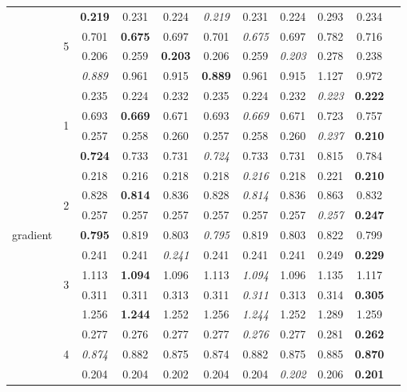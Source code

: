 \documentclass[authoryear, review, 11pt]{elsarticle}
\begin{document}
\begin{table}
\begin{center}
{\begin{tabular}{ccccccccccc}
  \cline{3-10}
  & \multirow{4}{*}{5} & \textbf{0.219} & 0.231 & 0.224 & \emph{0.219} & 0.231 & 0.224 & 0.293 & 0.234 \\ 
  &  & 0.701 & \textbf{0.675} & 0.697 & 0.701 & \emph{0.675} & 0.697 & 0.782 & 0.716 \\ 
  &  & 0.206 & 0.259 & \textbf{0.203} & 0.206 & 0.259 & \emph{0.203} & 0.278 & 0.238 \\ 
  &  & \emph{0.889} & 0.961 & 0.915 & \textbf{0.889} & 0.961 & 0.915 & 1.127 & 0.972 \\ 
  \hline
  \multirow{20}{*}{gradient} & \multirow{4}{*}{1} & 0.235 & 0.224 & 0.232 & 0.235 & 0.224 & 0.232 & \emph{0.223} & \textbf{0.222} \\ 
  &  & 0.693 & \textbf{0.669} & 0.671 & 0.693 & \emph{0.669} & 0.671 & 0.723 & 0.757 \\ 
  &  & 0.257 & 0.258 & 0.260 & 0.257 & 0.258 & 0.260 & \emph{0.237} & \textbf{0.210} \\ 
  &  & \textbf{0.724} & 0.733 & 0.731 & \emph{0.724} & 0.733 & 0.731 & 0.815 & 0.784 \\ 
  \cline{3-10}
  & \multirow{4}{*}{2} & 0.218 & 0.216 & 0.218 & 0.218 & \emph{0.216} & 0.218 & 0.221 & \textbf{0.210} \\ 
  &  & 0.828 & \textbf{0.814} & 0.836 & 0.828 & \emph{0.814} & 0.836 & 0.863 & 0.832 \\ 
  &  & 0.257 & 0.257 & 0.257 & 0.257 & 0.257 & 0.257 & \emph{0.257} & \textbf{0.247} \\ 
  &  & \textbf{0.795} & 0.819 & 0.803 & \emph{0.795} & 0.819 & 0.803 & 0.822 & 0.799 \\ 
  \cline{3-10}
  & \multirow{4}{*}{3} & 0.241 & 0.241 & \emph{0.241} & 0.241 & 0.241 & 0.241 & 0.249 & \textbf{0.229} \\ 
  &  & 1.113 & \textbf{1.094} & 1.096 & 1.113 & \emph{1.094} & 1.096 & 1.135 & 1.117 \\ 
  &  & 0.311 & 0.311 & 0.313 & 0.311 & \emph{0.311} & 0.313 & 0.314 & \textbf{0.305} \\ 
  &  & 1.256 & \textbf{1.244} & 1.252 & 1.256 & \emph{1.244} & 1.252 & 1.289 & 1.259 \\ 
  \cline{3-10}
  & \multirow{4}{*}{4} & 0.277 & 0.276 & 0.277 & 0.277 & \emph{0.276} & 0.277 & 0.281 & \textbf{0.262} \\ 
  &  & \emph{0.874} & 0.882 & 0.875 & 0.874 & 0.882 & 0.875 & 0.885 & \textbf{0.870} \\ 
  &  & 0.204 & 0.204 & 0.202 & 0.204 & 0.204 & \emph{0.202} & 0.206 & \textbf{0.201} \\ 

\end{tabular}}
\end{center}
\end{table}
\end{document}
